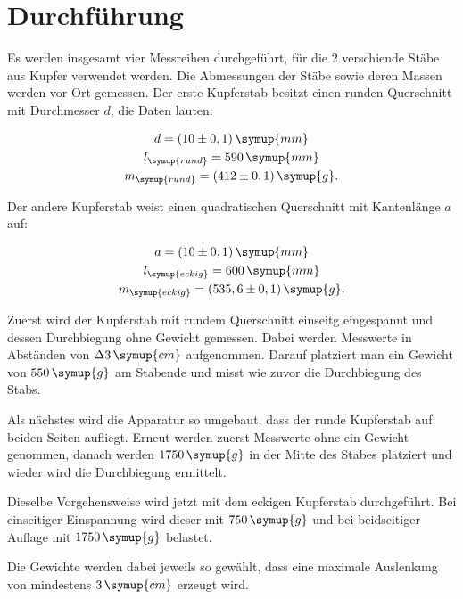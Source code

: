 \section{Durchführung}
\label{sec:Durchführung}

Es werden insgesamt vier Messreihen durchgeführt, für die 2 verschiende Stäbe aus Kupfer verwendet werden.
Die Abmessungen der Stäbe sowie deren Massen werden vor Ort gemessen.
Der erste Kupferstab besitzt einen runden Querschnitt mit Durchmesser $d$, die Daten lauten:

\begin{gather}
    d=(10\pm0,1)\,\symup{mm} \notag \\
    l_{\symup{rund}}=590\,\symup{mm} \notag \\
    m_{\symup{rund}}=(412\pm0,1)\,\symup{g} \notag.
\end{gather}

Der andere Kupferstab weist einen quadratischen Querschnitt mit Kantenlänge $a$ auf:

\begin{gather}
    a=(10\pm0,1)\,\symup{mm} \notag \\
    l_{\symup{eckig}}=600\,\symup{mm} \notag \\
    m_{\symup{eckig}}=(535,6\pm0,1)\,\symup{g} \notag.
\end{gather}

Zuerst wird der Kupferstab mit rundem Querschnitt einseitg eingespannt und dessen Durchbiegung ohne Gewicht gemessen.
Dabei werden Messwerte in Abständen von $\Delta 3\,\symup{cm}$ aufgenommen.
Darauf platziert man ein Gewicht von $550\,\symup{g}$ am Stabende und misst wie zuvor die Durchbiegung des Stabs.

Als nächstes wird die Apparatur so umgebaut, dass der runde Kupferstab auf beiden Seiten aufliegt.
Erneut werden zuerst Messwerte ohne ein Gewicht genommen, danach werden $1750\,\symup{g}$
in der Mitte des Stabes platziert und wieder wird die Durchbiegung ermittelt.

Dieselbe Vorgehensweise wird jetzt mit dem eckigen Kupferstab durchgeführt.
Bei einseitiger Einspannung wird dieser mit $750\,\symup{g}$ und bei beidseitiger Auflage mit $1750\,\symup{g}$ belastet.

Die Gewichte werden dabei jeweils so gewählt, dass eine maximale Auslenkung von mindestens $3\,\symup{cm}$ erzeugt wird.